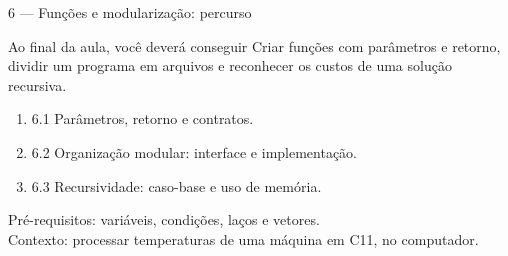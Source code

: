 \begin{frame}{6 — Funções e modularização: percurso}
\begin{block}{Ao final da aula, você deverá conseguir}
Criar funções com parâmetros e retorno, dividir um programa em arquivos e reconhecer os custos de uma solução recursiva.
\end{block}
\begin{enumerate}
\item 6.1 Parâmetros, retorno e contratos.
\item 6.2 Organização modular: interface e implementação.
\item 6.3 Recursividade: caso-base e uso de memória.
\end{enumerate}
\small Pré-requisitos: variáveis, condições, laços e vetores.\\
Contexto: processar temperaturas de uma máquina em C11, no computador.
\end{frame}
